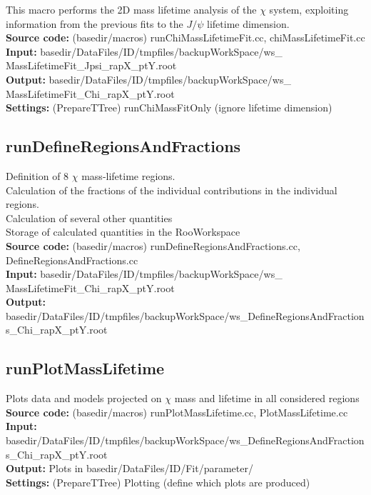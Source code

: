 \documentclass{article}
\begin{document}
This macro performs the 2D mass lifetime analysis of the $\chi$ system, exploiting information from the previous fits to the $J/\psi$ lifetime dimension.
\\{\bf Source code:} (basedir/macros) runChiMassLifetimeFit.cc, chiMassLifetimeFit.cc
\\{\bf Input:} basedir/DataFiles/ID/tmpfiles/backupWorkSpace/ws\_ MassLifetimeFit\_Jpsi\_rapX\_ptY.root
\\{\bf Output:} basedir/DataFiles/ID/tmpfiles/backupWorkSpace/ws\_ MassLifetimeFit\_Chi\_rapX\_ptY.root
\\{\bf Settings:} (PrepareTTree) runChiMassFitOnly (ignore lifetime dimension)

\subsection{runDefineRegionsAndFractions}

Definition of 8 $\chi$ mass-lifetime regions.
\\Calculation of the fractions of the individual contributions in the individual regions.
\\Calculation of several other quantities
\\Storage of calculated quantities in the RooWorkspace
\\{\bf Source code:} (basedir/macros) runDefineRegionsAndFractions.cc, DefineRegionsAndFractions.cc
\\{\bf Input:} basedir/DataFiles/ID/tmpfiles/backupWorkSpace/ws\_ MassLifetimeFit\_Chi\_rapX\_ptY.root
\\{\bf Output:} basedir/DataFiles/ID/tmpfiles/backupWorkSpace/ws\_DefineRegionsAndFractions\_Chi\_rapX\_ptY.root

\subsection{runPlotMassLifetime}

Plots data and models projected on $\chi$ mass and lifetime in all considered regions
\\{\bf Source code:} (basedir/macros) runPlotMassLifetime.cc, PlotMassLifetime.cc
\\{\bf Input:} basedir/DataFiles/ID/tmpfiles/backupWorkSpace/ws\_DefineRegionsAndFractions\_Chi\_rapX\_ptY.root
\\{\bf Output:} Plots in basedir/DataFiles/ID/Fit/parameter/
\\{\bf Settings:} (PrepareTTree) Plotting (define which plots are produced)
\end{document}
